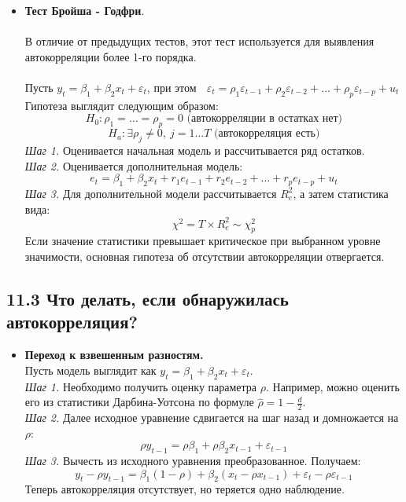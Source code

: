 \documentclass[a0,final]{a0poster}
\begin{document}
\begin{multicols}{4}
\begin{itemize}
\item \textbf{Тест Бройша - Годфри}. \\
\\
В отличие от предыдущих тестов, этот тест используется для выявления автокорреляции более 1-го порядка. \\
\\
Пусть $y_t=\beta_1+\beta_2x_t+\varepsilon_t$, при этом $\;$ $\varepsilon_t=\rho_1\varepsilon_{t-1}+\rho_2\varepsilon_{t-2}+\dotsc+\rho_p\varepsilon_{t-p}+u_t$ \\
Гипотеза выглядит следующим образом:
$$H_0: \rho_1=\dotsc=\rho_p=0 \text{ (автокорреляции в остатках нет)}$$
$$H_a: \exists\rho_j\neq0,\:j=1\dotsc T \text{ (автокорреляция есть)}$$
\textit{Шаг 1.} Оценивается начальная модель и рассчитывается ряд остатков. \\
\textit{Шаг 2.} Оценивается дополнительная модель:
$$e_t=\beta_1+\beta_2x_t+r_1e_{t-1}+r_2e_{t-2}+\dotsc+r_pe_{t-p}+u_t$$
\textit{Шаг 3.} Для дополнительной модели рассчитывается $R^2_{e}$, а затем статистика вида:
$$\chi^2 = T\times R^2_{e}\sim\chi^2_p$$
Если значение статистики превышает критическое при выбранном уровне значимости, основная гипотеза об отсутствии автокорреляции отвергается.

\end{itemize}

\subsection*{\textbf{11.3 Что делать, если обнаружилась автокорреляция?}}
\begin{itemize}

\item \textbf{Переход к взвешенным разностям.} \\
Пусть модель выглядит как $y_t = \beta_1 + \beta_2x_t + \varepsilon_t$.\\
\textit{Шаг 1.} Необходимо получить оценку параметра $\rho$. Например, можно оценить его из статистики Дарбина-Уотсона по формуле $\hat{\rho}=1-\frac{d}{2}$. \\
\textit{Шаг 2.} Далее исходное уравнение сдвигается на шаг назад и домножается на $\rho$:
$$\rho y_{t-1}=\rho \beta_1 + \rho \beta_2x_{t-1}+\varepsilon_{t-1}$$
\textit{Шаг 3.} Вычесть из исходного уравнения преобразованное. Получаем: $$y_t-\rho y_{t-1} = \beta_1(1-\rho) +\beta_2(x_t - \rho x_{t-1}) + \varepsilon_t - \rho \varepsilon_{t-1}$$
Теперь автокорреляция отсутствует, но теряется одно наблюдение.\\


\end{itemize}
\end{multicols}
\end{document}
